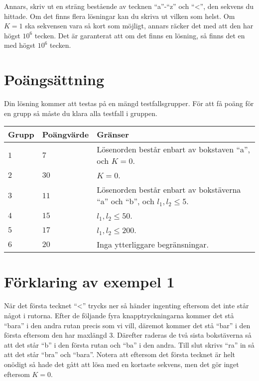 Annars, skriv ut en sträng bestående av tecknen ``a''-``z'' och ``<'', den sekvens du hittade. Om det 
finns flera lösningar kan du skriva ut vilken som helst. Om $K = 1$ ska sekvensen vara så kort som möjligt, 
annars räcker det med att den har högst $10^6$ tecken. Det är garanterat att om det finns en lösning, 
så finns det en med högst $10^6$ tecken.

\section*{Poängsättning}
Din lösning kommer att testas på en mängd testfallsgrupper.
För att få poäng för en grupp så måste du klara alla testfall i gruppen.

\noindent
\begin{tabular}{| l | l | l |}
\hline
Grupp & Poängvärde & Gränser \\ \hline
$1$   & $7$       & Lösenorden består enbart av bokstaven ``a'', och $K = 0$. \\ \hline
$2$   & $30$       & $K = 0$. \\ \hline
$3$   & $11$       & Lösenorden består enbart av bokstäverna ``a'' och ``b'', och $l_1, l_2 \leq 5$.  \\ \hline
$4$   & $15$       & $l_1, l_2 \leq 50$. \\ \hline
$5$   & $17$       & $l_1, l_2 \leq 200$. \\ \hline
$6$   & $20$       & Inga ytterliggare begränsningar.  \\ \hline
\end{tabular}

\section*{Förklaring av exempel 1}
När det första tecknet ``<'' trycks ner så händer ingenting eftersom det inte står något i rutorna. Efter de följande
 fyra knapptryckningarna kommer det stå ``bara'' i den andra rutan precis som vi vill, däremot kommer det stå ``bar'' 
 i den första eftersom den har maxlängd $3$. Därefter raderas de två sista bokstäverna så att det står ``b'' i 
 den första rutan och ``ba'' i den andra. Till slut skrivs ``ra'' in så att det står ``bra'' och ``bara''. Notera 
 att eftersom det första tecknet är helt onödigt så hade det gått att lösa med en kortaste sekvens, men det gör inget 
 eftersom $K = 0$.